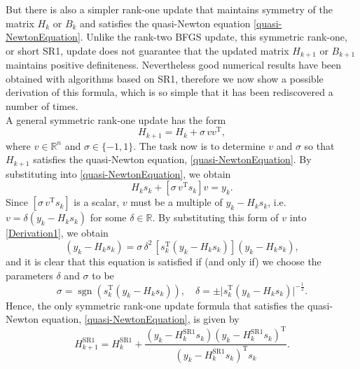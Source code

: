 But there is also a simpler rank-one update that maintains symmetry of the matrix $H_k$ or $B_k$ and satisfies the quasi-Newton equation \cref{quasi-NewtonEquation}. Unlike the rank-two BFGS update, this symmetric rank-one, or short SR1, update does not guarantee that the updated matrix $H_{k+1}$ or $B_{k+1}$ maintains positive definiteness. Nevertheless good numerical results have been obtained with algorithms based on SR1, therefore we now show a possible derivation of this formula, which is so simple that it has been rediscovered a number of times. \\
A general symmetric rank-one update has the form
\begin{equation*}
    H_{k+1} = H_k + \sigma \, v v^{\mathrm{T}},
\end{equation*}
where $v \in \mathbb{R}^n$ and $\sigma \in \{-1,1\}$. The task now is to determine $v$ and $\sigma$ so that $H_{k+1}$ satisfies the quasi-Newton equation, \cref{quasi-NewtonEquation}. By substituting into \cref{quasi-NewtonEquation}, we obtain
\begin{equation}\label{Derivation1}
    H_k s_k + [\sigma \, v^{\mathrm{T}} s_k] v = y_k.
\end{equation}
Since $[\sigma \, v^{\mathrm{T}} s_k]$ is a scalar, $v$ must be a multiple of $y_k − H_k s_k$, i.e. $v = \delta (y_k − H_k s_k)$ for some $\delta \in \mathbb{R}$. By substituting this form of $v$ into \cref{Derivation1}, we obtain
\begin{equation}\label{Derivation2}
    (y_k − H_k s_k) = \sigma \, \delta^2 \, [s^{\mathrm{T}}_k (y_k − H_k s_k)](y_k − H_k s_k),
\end{equation}
and it is clear that this equation is satisfied if (and only if) we choose the parameters $\delta$ and $\sigma$ to be
\begin{equation*}
    \sigma = \operatorname{sgn} (s^{\mathrm{T}}_k (y_k − H_k s_k)), \quad \delta = \pm \lvert s^{\mathrm{T}}_k (y_k − H_k s_k) \rvert^{-\frac{1}{2}}.
\end{equation*}
Hence, the only symmetric rank-one update formula that satisfies the quasi-Newton equation, \cref{quasi-NewtonEquation}, is given by
\begin{equation}\label{directSR1formula}
    H^\mathrm{SR1}_{k+1} = H^\mathrm{SR1}_k + \frac{(y_k - H^\mathrm{SR1}_k s_k) (y_k - H^\mathrm{SR1}_k s_k)^{\mathrm{T}}}{(y_k - H^\mathrm{SR1}_k s_k)^{\mathrm{T}} s_k}.
\end{equation}

